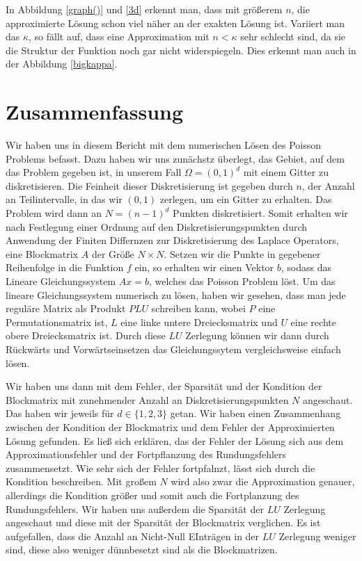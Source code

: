 \documentclass[smallheadings]{scrartcl}
\theoremstyle{definition}
\begin{document}
In Abbildung \ref{graph()} und \ref{3d} erkennt man, dass mit größerem $n$, die approximierte Lösung schon viel näher an der exakten Lösung ist. Variiert man das $\kappa$, so fällt auf, dass eine Approximation mit $n<\kappa$ sehr schlecht sind, da sie die Struktur der Funktion noch gar nicht widerspiegeln.  Dies erkennt man auch in der Abbildung \ref{bigkappa}.

\section{Zusammenfassung}

Wir haben uns in diesem Bericht mit dem numerischen Lösen des Poisson Problems befasst. Dazu haben wir uns zunächstz überlegt, das Gebiet, auf dem das Problem gegeben ist, in unserem Fall $\Omega =(0,1)^d$ mit einem Gitter zu diskretisieren. Die Feinheit dieser Diskretisierung ist gegeben durch $n$, der Anzahl an Teilintervalle, in das wir $(0,1)$ zerlegen, um ein Gitter zu erhalten. Das Problem wird dann an $N=(n-1)^d$ Punkten diskretisiert. Somit erhalten wir nach Festlegung einer Ordnung auf den Diskretisierungspunkten durch Anwendung der Finiten Differnzen zur Diskretisierung des Laplace Operators, eine Blockmatrix $A$ der Größe $N\times N$. Setzen wir die Punkte in gegebener Reihenfolge in die Funktion $f$ ein, so erhalten wir einen Vektor $b$, sodass das Lineare Gleichungssystem $Ax=b$, welches das Poisson Problem löst. Um das lineare Gleichungssystem numerisch zu lösen, haben wir gesehen, dass man jede reguläre Matrix als Produkt $PLU$ schreiben kann, wobei $P$ eine Permutationsmatrix ist, $L$ eine linke untere Dreiecksmatrix und $U$ eine rechte obere Dreiecksmatrix ist. Durch diese $LU$ Zerlegung können wir dann durch Rückwärts und Vorwärtseinsetzen das Gleichungssytem vergleichsweise einfach lösen. 

Wir haben uns dann mit dem Fehler, der Sparsität und der Kondition der Blockmatrix mit zunehmender Anzahl an Diskretisierungspunkten $N$ angeschaut. Das haben wir jeweils für $d\in\{1,2,3\}$ getan. Wir haben einen Zusammenhang zwischen der Kondition der Blockmatrix und dem Fehler der Approximierten Lösung gefunden. Es ließ sich erklären, das der Fehler der Lösung sich aus dem Approximationsfehler und der Fortpflanzung des Rundungsfehlers zusammensetzt. Wie sehr sich der Fehler fortpfalnzt, lässt sich durch die Kondition beschreiben. Mit großem $N$ wird also zwar die Approximation genauer, allerdings die Kondition größer und somit auch die Fortplanzung des Rundungsfehlers. Wir haben uns außerdem die Sparsität der $LU$ Zerlegung angeschaut und diese mit der Sparsität der Blockmatrix verglichen. Es ist aufgefallen, dass die Anzahl an Nicht-Null EInträgen in der $LU$ Zerlegung weniger sind, diese also weniger dünnbesetzt sind als die Blockmatrizen.
\end{document}
